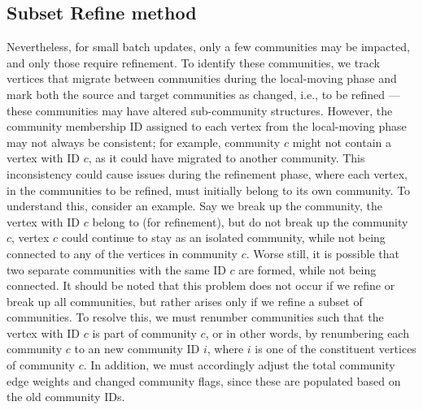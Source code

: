 \subsection{Subset Refine method}
\label{sec:subset-refine-method}

Nevertheless, for small batch updates, only a few communities may be impacted, and only those require refinement. To identify these communities, we track vertices that migrate between communities during the local-moving phase and mark both the source and target communities as changed, i.e., to be refined --- these communities may have altered sub-community structures. However, the community membership ID assigned to each vertex from the local-moving phase may not always be consistent; for example, community $c$ might not contain a vertex with ID $c$, as it could have migrated to another community. This inconsistency could cause issues during the refinement phase, where each vertex, in the communities to be refined, must initially belong to its own community. To understand this, consider an example. Say we break up the community, the vertex with ID $c$ belong to (for refinement), but do not break up the community $c$, vertex $c$ could continue to stay as an isolated community, while not being connected to any of the vertices in community $c$. Worse still, it is possible that two separate communities with the same ID $c$ are formed, while not being connected. It should be noted that this problem does not occur if we refine or break up all communities, but rather arises only if we refine a subset of communities. To resolve this, we must renumber communities such that the vertex with ID $c$ is part of community $c$, or in other words, by renumbering each community $c$ to an new community ID $i$, where $i$ is one of the constituent vertices of community $c$. In addition, we must accordingly adjust the total community edge weights and changed community flags, since these are populated based on the old community IDs.

